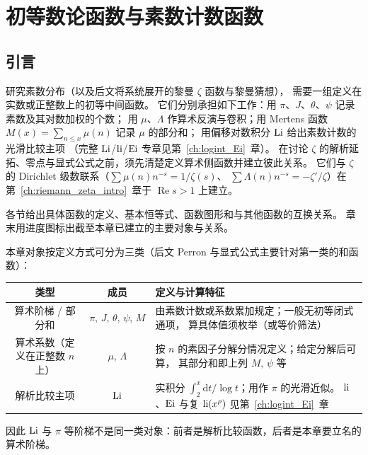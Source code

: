 \chapter{初等数论函数与素数计数函数}\label{ch:elementary_number_theoretic_functions}

\section{引言}\label{sec:intro_elementary_functions}

研究素数分布（以及后文将系统展开的黎曼 $\zeta$ 函数与黎曼猜想），
需要一组定义在实数或正整数上的初等中间函数。
它们分别承担如下工作：用 $\pi$、$J$、$\theta$、$\psi$ 记录素数及其对数加权的个数；
用 $\mu$、$\Lambda$ 作算术反演与卷积；用 Mertens 函数 $M(x)=\sum_{n\le x}\mu(n)$ 记录 $\mu$ 的部分和；
用偏移对数积分 $\operatorname{Li}$ 给出素数计数的光滑比较主项
（完整 $\operatorname{Li}$/$\operatorname{li}$/$\operatorname{Ei}$ 专章见第~\ref{ch:logint_Ei}~章）。
在讨论 $\zeta$ 的解析延拓、零点与显式公式之前，须先清楚定义算术侧函数并建立彼此关系。
它们与 $\zeta$ 的 Dirichlet 级数联系（$\sum\mu(n)n^{-s}=1/\zeta(s)$、
$\sum\Lambda(n)n^{-s}=-\zeta'/\zeta$）在第~\ref{ch:riemann_zeta_intro}~章于 $\operatorname{Re}s>1$ 上建立。

各节给出具体函数的定义、基本恒等式、函数图形和与其他函数的互换关系。
章末用进度图标出截至本章已建立的主要对象与关系。

本章对象按定义方式可分为三类（后文 Perron 与显式公式主要针对第一类的和函数）：

\begin{center}
\renewcommand{\arraystretch}{1.35}
\begin{tabular}{|c|c|p{6.2cm}|}
\hline
\textbf{类型} & \textbf{成员} & \textbf{定义与计算特征} \\
\hline
算术阶梯 / 部分和
  & $\pi,\,J,\,\theta,\,\psi,\,M$
  & 由素数计数或系数累加规定；一般无初等闭式通项，
    算具体值须枚举（或等价筛法） \\
\hline
算术系数（定义在正整数 $n$ 上）
  & $\mu,\,\Lambda$
  & 按 $n$ 的素因子分解分情况定义；给定分解后可算，
    其部分和即上列 $M,\,\psi$ 等 \\
\hline
解析比较主项
  & $\operatorname{Li}$
  & 实积分 $\int_2^x\mathrm{d}t/\log t$；用作 $\pi$ 的光滑近似。
    $\operatorname{li}$、$\operatorname{Ei}$ 与复 $\operatorname{li}(x^{\rho})$ 见第~\ref{ch:logint_Ei}~章 \\
\hline
\end{tabular}
\end{center}

\noindent
因此 $\operatorname{Li}$ 与 $\pi$ 等阶梯不是同一类对象：前者是解析比较函数，后者是本章要立名的算术阶梯。


